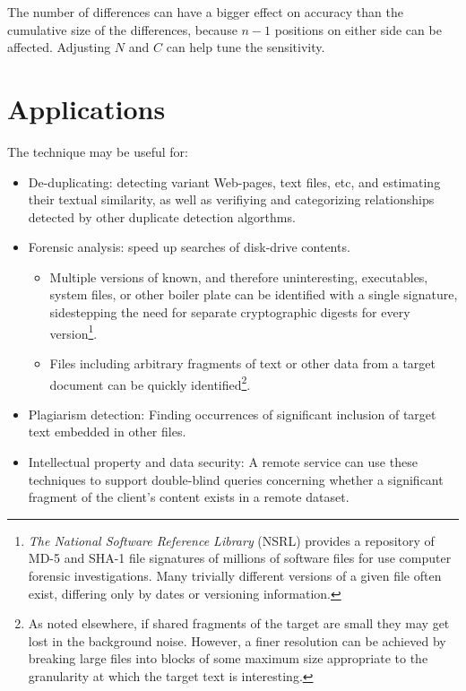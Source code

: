 \documentclass[html]{article}    %
\begin{document}
The number of differences can have a bigger effect on accuracy than the cumulative size of the differences, because 
$n-1$ positions on either side can be affected.
Adjusting $N$ and $C$ can help tune the sensitivity.

\section{Applications}
The technique may be useful for:
\begin{itemize}
  \item { De-duplicating: detecting variant Web-pages, text files, etc, and estimating their textual similarity, as well as verifiying 
	and categorizing relationships detected by other duplicate detection algorthms.
  }
  \item {Forensic analysis: speed up searches of disk-drive contents.
		\begin{itemize}
 		\item{ 
  			Multiple versions of known, and therefore uninteresting, executables, system files, or other boiler plate can 
			be identified with a single signature, sidestepping the need for separate cryptographic digests for 
  			every version\footnote{
 				{\em The National Software Reference Library} (NSRL) provides a repository
 					of MD-5 and SHA-1 file signatures of millions of software files for use
 					computer forensic investigations. Many trivially different versions of a given file often 
					exist, differing only by dates or versioning information.
				}. 
  		}
  		\item{
  			Files including arbitrary fragments of text or other data from a target document can be quickly identified\footnote{
  				As noted elsewhere, if shared fragments of the target are small they may get lost in the background noise.  
				However, a finer resolution can be achieved by breaking large files into blocks of some maximum size 
				appropriate to the granularity at which the target text is interesting.
			}. 
  		}
		\end{itemize}
  }
  \item {Plagiarism detection: Finding occurrences of significant 
  	inclusion of target text embedded in other files.  
  	}
  \item{Intellectual property and data security: A remote service can use these
  		techniques to support double-blind queries concerning whether a significant fragment of the client's content exists in a remote dataset. 
  		
}
\end{itemize}
\end{document}
